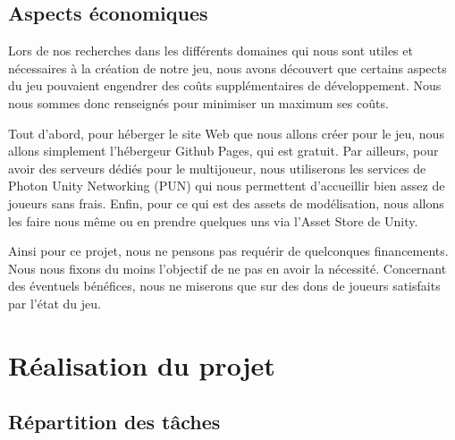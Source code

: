 \documentclass[12pt]{article}
\begin{document}
        \subsection{Aspects économiques}
                Lors de nos recherches dans les différents domaines qui nous sont utiles et nécessaires à la création de notre jeu, nous avons découvert que certains aspects du jeu pouvaient engendrer des coûts supplémentaires de développement. Nous nous sommes donc renseignés pour minimiser un maximum ses coûts.
                \\
                \par Tout d'abord, pour héberger le site Web que nous allons créer pour le jeu, nous allons simplement l'hébergeur Github Pages, qui est gratuit. Par ailleurs, pour avoir des serveurs dédiés pour le multijoueur, nous utiliserons les services de Photon Unity Networking (PUN) qui nous permettent d'accueillir bien assez de joueurs sans frais. Enfin, pour ce qui est des assets de modélisation, nous allons les faire nous même ou en prendre quelques uns via l'Asset Store de Unity.
                \\
                \par Ainsi pour ce projet, nous ne pensons pas requérir de quelconques financements. Nous nous fixons du moins l'objectif de ne pas en avoir la nécessité. Concernant des éventuels bénéfices, nous ne miserons que sur des dons de joueurs satisfaits par l'état du jeu.
        \clearpage
        
        \section{Réalisation du projet}
            \subsection{Répartition des tâches}
            
\end{document}
